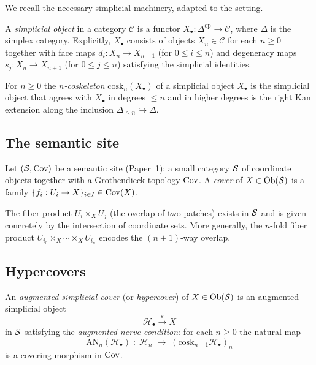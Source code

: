 \documentclass[11pt]{article}
\newcommand{\HC}{\mathcal{H}}              %
\newcommand{\AugNerve}{\mathrm{AN}}        %
\newcommand{\cosk}{\mathrm{cosk}}          %
\newcommand{\face}[1]{d_{#1}}             %
\newcommand{\degen}[1]{s_{#1}}            %
\newcommand{\aug}{\varepsilon}             %
\begin{document}
We recall the necessary simplicial machinery, adapted to the \JuGeo{}
setting.

\begin{definition}\label{def:simplicial}
  A \emph{simplicial object} in a category $\mathcal{C}$ is a functor
  $X_\bullet : \Delta^{\mathrm{op}} \to \mathcal{C}$, where $\Delta$
  is the simplex category.  Explicitly, $X_\bullet$ consists of objects
  $X_n \in \mathcal{C}$ for each $n \ge 0$ together with face maps
  $\face{i} : X_n \to X_{n-1}$ (for $0 \le i \le n$) and degeneracy
  maps $\degen{j} : X_n \to X_{n+1}$ (for $0 \le j \le n$) satisfying
  the simplicial identities.
\end{definition}

\begin{definition}[Coskeleton]\label{def:cosk}
  For $n \ge 0$ the \emph{$n$-coskeleton} $\cosk_n(X_\bullet)$ of a
  simplicial object $X_\bullet$ is the simplicial object that agrees
  with $X_\bullet$ in degrees $\le n$ and in higher degrees is the
  right Kan extension along the inclusion
  $\Delta_{\le n} \hookrightarrow \Delta$.
\end{definition}

\subsection{The semantic site}

Let $(\mathcal{S}, \mathrm{Cov})$ be a \JuGeo{} semantic site (Paper~1): a small
category $\mathcal{S}$ of coordinate objects together with a Grothendieck
topology $\mathrm{Cov}$.  A \emph{cover} of $X \in \mathrm{Ob}(\mathcal{S})$ is a family
$\{f_i : U_i \to X\}_{i \in I} \in \mathrm{Cov}(X)$.

The fiber product $U_i \times_X U_j$ (the overlap of two patches)
exists in $\mathcal{S}$ and is given concretely by the intersection of
coordinate sets.  More generally, the $n$-fold fiber product
$U_{i_0} \times_X \cdots \times_X U_{i_n}$ encodes the $(n{+}1)$-way
overlap.

\subsection{Hypercovers}

\begin{definition}[Hypercover]\label{def:hc}
  An \emph{augmented simplicial cover} (or \emph{hypercover}) of
  $X \in \mathrm{Ob}(\mathcal{S})$ is an augmented simplicial object
  \[
    \HC_\bullet \xrightarrow{\aug} X
  \]
  in $\mathcal{S}$ satisfying the \emph{augmented nerve condition}:
  for each $n \ge 0$ the natural map
  \[
    \AugNerve_n(\HC_\bullet) \;:\;
    \HC_n \;\longrightarrow\;
    (\cosk_{n-1}\HC_\bullet)_n
  \]
  is a covering morphism in $\mathrm{Cov}$.
\end{definition}
\end{document}
